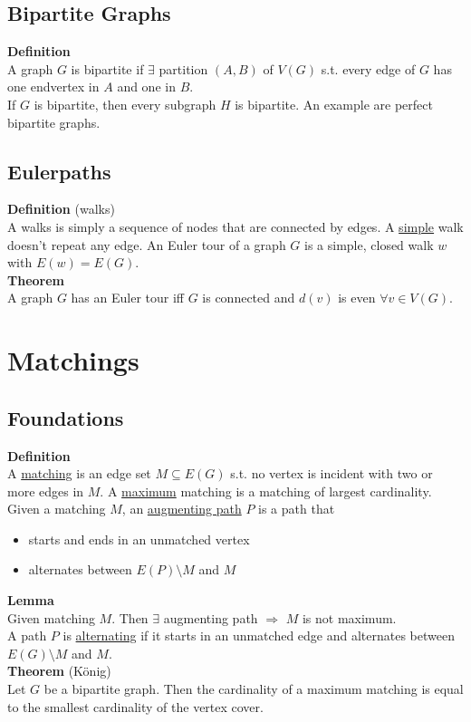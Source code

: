 \documentclass[a4paper, 12pt]{article}
\begin{document}
	\subsection{Bipartite Graphs}
	\textbf{Definition}\\
	A graph $G$ is bipartite if $\exists$ partition $(A,B)$ of $V(G)$ s.t. every edge of $G$ has one endvertex in $A$ and one in $B$.\\
	If $G$ is bipartite, then every subgraph $H$ is bipartite. An example are perfect bipartite graphs.
	\subsection{Eulerpaths}
	\textbf{Definition} (walks)\\
	A walks is simply a sequence of nodes that are connected by edges. A \underline{simple} walk doesn't repeat any edge. An Euler tour of a graph $G$ is a simple, closed walk $w$ with $E(w) = E(G)$.\\
	\textbf{Theorem}\\
	A graph $G$ has an Euler tour iff $G$ is connected and $d(v)$ is even $\forall v \in V(G)$.
	\section{Matchings}
	\subsection{Foundations}
	\textbf{Definition}\\
	A \underline{matching} is an edge set $M \subseteq E(G)$ s.t. no vertex is incident with two or more edges in $M$. A \underline{maximum} matching is a matching of largest cardinality.\\
	
	Given a matching $M$, an \underline{augmenting path} $P$ is a path that \begin{itemize}
		\item starts and ends in an unmatched vertex
		\item alternates between $E(P)\setminus M$ and $M$
	\end{itemize}
	\textbf{Lemma}\\
	Given matching $M$. Then $\exists$ augmenting path $\Rightarrow$ $M$ is not maximum.\\
	
	A path $P$ is \underline{alternating} if it starts in an unmatched edge and alternates between $E(G)\setminus M$ and $M$.\\
	\textbf{Theorem} (König)\\
	Let $G$ be a bipartite graph. Then the cardinality of a maximum matching is equal to the smallest cardinality of the vertex cover.\\
	
\end{document}

